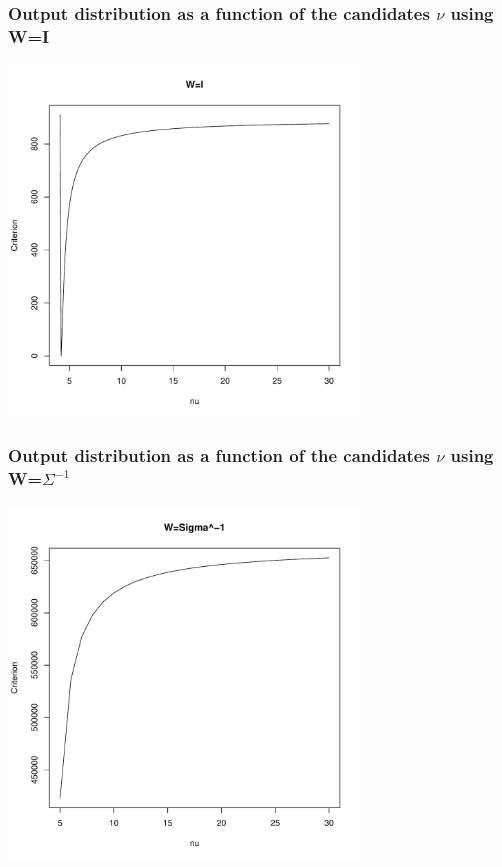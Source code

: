 \newpage


\subsubsection{Output distribution as a function of the candidates $\nu$ using W=I}
\begin{center}
    \includegraphics[width=0.7\textwidth]{Graph3_1.pdf}    
\end{center}
\subsubsection{Output distribution as a function of the candidates $\nu$ using W=$\Sigma^{-1}$}
\begin{center}
    \includegraphics[width=0.7\textwidth]{Graph4_1.pdf}    
\end{center}
